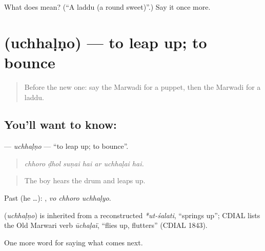 \begin{tcolorbox}[breakable,colback=teal!4,colframe=teal!35!black,title={Before you move on}]
What does  mean? (\textquotedblleft{}A laddu (a round sweet)\textquotedblright{}.) Say it once more.
\end{tcolorbox}
\section[\texorpdfstring{\mw{उछळणो} (uchhaḷṇo)}{उछळणो (uchhaḷṇo)}]{ (uchhaḷṇo) — to leap up; to bounce}

\label{lesson:MW-C224-uchhalno}



\begin{quote}
Before the new one: say the Marwadi for a puppet, then the Marwadi for a laddu.
\end{quote}

\subsection*{You'll want to know: }
\textbf{} — \emph{uchhaḷṇo} — \textquotedblleft{}to leap up; to bounce\textquotedblright{}.

\begin{quote}
      
\end{quote}

\begin{quote}
\emph{chhoro ḍhol suṇai hai ar uchhaḷai hai.}
\end{quote}

\begin{quote}
The boy hears the drum and leaps up.
\end{quote}

Past (he …):   , \emph{vo chhoro uchhaḷyo}.

\begin{cousinweb}
\textbf{} (\emph{uchhaḷṇo}) is inherited from a reconstructed \emph{*ut-śalati}, \textquotedblleft{}springs up\textquotedblright{}; CDIAL lists the Old Marwari verb \emph{ūchaḷaï}, \textquotedblleft{}flies up, flutters\textquotedblright{} (CDIAL 1843).
\end{cousinweb}

\begin{grammarlens}[title={What you've built}]
One more word for saying what comes next.
\end{grammarlens}

